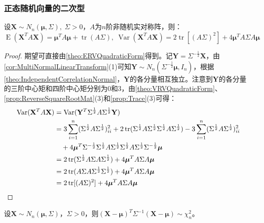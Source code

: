 \subsubsection{正态随机向量的二次型}
\begin{theorem}
	设$\mathbf{X}\sim N_n(\boldsymbol{\mu},\Sigma),\;\Sigma>0$，$A$为$n$阶非随机实对称阵，则：
	\begin{equation*}
		\operatorname{E}(\mathbf{X}^TA\mathbf{X})=\boldsymbol{\mu}^TA\boldsymbol{\mu}+\operatorname{tr}(A\Sigma),\;
		\operatorname{Var}(\mathbf{X}^TA\mathbf{X})=2\operatorname{tr}[(A\Sigma)^2]+4\boldsymbol{\mu}^TA\Sigma A\boldsymbol{\mu}
	\end{equation*}
\end{theorem}
\begin{proof}
	期望可直接由\cref{theo:ERVQuadraticForm}得到。记$\mathbf{Y}=\Sigma^{-\frac{1}{2}}\mathbf{X}$，由\cref{cor:MultiNormalLinearTransform}(1)可知$\mathbf{Y}\sim N_n(\Sigma^{-\frac{1}{2}}\boldsymbol{\mu},I_n)$，根据\cref{theo:IndependentCorrelationNormal}，$\mathbf{Y}$的各分量相互独立。注意到$\mathbf{Y}$的各分量的三阶中心矩和四阶中心矩分别为$0$和$3$，由\cref{theo:VRVQuadraticForm}、\cref{prop:ReverseSquareRootMat}(3)和\cref{prop:Trace}(3)可得：
	\begin{align*}
		\operatorname{Var}(\mathbf{X}^TA\mathbf{X})
		&=\operatorname{Var}(\mathbf{Y}^T\Sigma^{\frac{1}{2}}A\Sigma^{\frac{1}{2}}\mathbf{Y}) \\
		&=3\sum_{i=1}^{n}(\Sigma^{\frac{1}{2}}A\Sigma^{\frac{1}{2}})_{ii}^2+2\operatorname{tr}(\Sigma^{\frac{1}{2}}A\Sigma^{\frac{1}{2}}\Sigma^{\frac{1}{2}}A\Sigma^{\frac{1}{2}})-3\sum_{i=1}^{n}(\Sigma^{\frac{1}{2}}A\Sigma^{\frac{1}{2}})_{ii}^2 \\
		&\quad+4\boldsymbol{\mu}^T\Sigma^{-\frac{1}{2}}\Sigma^{\frac{1}{2}}A\Sigma^{\frac{1}{2}}\Sigma^{\frac{1}{2}}A\Sigma^{\frac{1}{2}}\Sigma^{-\frac{1}{2}}\boldsymbol{\mu} \\
		&=2\operatorname{tr}(\Sigma^{\frac{1}{2}}A\Sigma A\Sigma^{\frac{1}{2}})+4\boldsymbol{\mu}^TA\Sigma A\boldsymbol{\mu} \\
		&=2\operatorname{tr}(A\Sigma A\Sigma^{\frac{1}{2}}\Sigma^{\frac{1}{2}})+4\boldsymbol{\mu}^TA\Sigma A\boldsymbol{\mu} \\
		&=2\operatorname{tr}[(A\Sigma)^2]+4\boldsymbol{\mu}^TA\Sigma A\boldsymbol{\mu}\qedhere
	\end{align*}
\end{proof}
\begin{theorem}
	设$\mathbf{X}\sim N_n(\boldsymbol{\mu},\Sigma)$，$\Sigma>0$，则$(\mathbf{X}-\boldsymbol{\mu})^T\Sigma^{-1}(\mathbf{X}-\boldsymbol{\mu})\sim\chi_n^2$。
\end{theorem}
